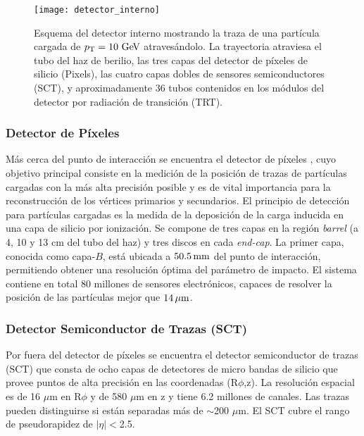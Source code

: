 \begin{figure}[!p]
  \centering

  \texttt{[image: detector\_interno]}
  \caption{Esquema del detector interno mostrando la traza de una partícula
    cargada de $\pt = 10\gev$ atravesándolo. La trayectoria atraviesa el
    tubo del haz de berilio, las tres capas del detector de píxeles de silicio (Pixels),
    las cuatro capas dobles de sensores semiconductores (SCT), y
    aproximadamente 36 tubos contenidos en los módulos del detector por radiación
  de transición (TRT).}\label{fig:detector_interno}

\end{figure}

\subsubsection{Detector de Píxeles}

Más cerca del punto de interacción se encuentra el detector de píxeles
\cite{Wermes:381263}, cuyo objetivo principal consiste en la medición de la
posición de trazas de partículas cargadas con la más alta precisión posible y es
de vital importancia para la reconstrucción de los vértices primarios y
secundarios. El principio de detección para partículas cargadas es la medida de
la deposición de la carga inducida en una capa de silicio por ionización.
Se compone de tres capas en la región \emph{barrel} (a 4, 10 y 13 cm del tubo
del haz) y tres discos en cada \emph{end-cap}.
La primer capa, conocida como capa-$B$, está ubicada a $\unit[50.5]{mm}$ del
punto de interacción, permitiendo obtener una resolución óptima del parámetro de impacto.
El sistema contiene en total 80 millones de sensores electrónicos, capaces de
resolver la posición de las partículas mejor que $\unit[14]{\mu m}$.


\subsubsection{Detector Semiconductor de Trazas (SCT)}

Por fuera del detector de píxeles se encuentra el detector semiconductor de
trazas (SCT) que consta de ocho capas de detectores de micro bandas de silicio
que provee puntos de alta precisión en las coordenadas (R$\phi$,z).
La
resolución espacial es de 16 $\mu$m en R$\phi$ y de 580 $\mu$m en z y tiene 6.2
millones de canales. Las trazas pueden distinguirse si están separadas más de
$\sim$200 $ \mu$m. El SCT cubre el rango de pseudorapidez de $|\eta|<$2.5.


